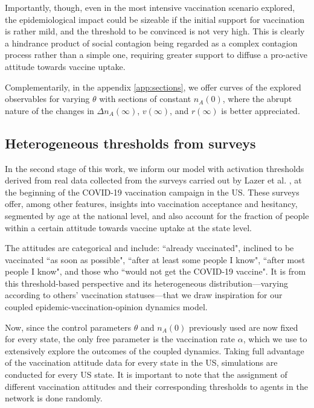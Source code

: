 \documentclass[
 reprint,
 amsmath,amssymb,
 aps,
]{revtex4-2}
\begin{document}
Importantly, though, even in the most intensive vaccination scenario explored, the epidemiological impact could be sizeable if the initial support for vaccination is rather mild, and the threshold to be convinced is not very high. This is clearly a hindrance product of social contagion being regarded as a complex contagion process rather than a simple one, requiring greater support to diffuse a pro-active attitude towards vaccine uptake.

Complementarily, in the appendix \ref{app:sections}, we offer curves of the explored observables for varying $\theta$ with sections of constant $n_A(0)$, where the abrupt nature of the changes in $\Delta n_A(\infty)$, $v(\infty)$, and $r(\infty)$ is better appreciated. %

\subsection{Heterogeneous thresholds from surveys}
\label{subsec:heterogeneous}

In the second stage of this work, we inform our model with activation thresholds derived from real data collected from the surveys carried out by Lazer et al. \cite{lazer2021covid}, at the beginning of the COVID-19 vaccination campaign in the US. These surveys offer, among other features, insights into vaccination acceptance and hesitancy, segmented by age at the national level, and also account for the fraction of people within a certain attitude towards vaccine uptake at the state level.

The attitudes are categorical and include: ``already vaccinated", inclined to be vaccinated ``as soon as possible", ``after at least some people I know", ``after most people I know", and those who ``would not get the COVID-19 vaccine". It is from this threshold-based perspective and its heterogeneous distribution—varying according to others' vaccination statuses—that we draw inspiration for our coupled epidemic-vaccination-opinion dynamics model.

Now, since the control parameters $\theta$ and $n_A(0)$ previously used are now fixed for every state, the only free parameter is the vaccination rate $\alpha$, which we use to extensively explore the outcomes of the coupled dynamics. Taking full advantage of the vaccination attitude data for every state in the US, simulations are conducted for every US state. It is important to note that the assignment of different vaccination attitudes and their corresponding thresholds to agents in the network is done randomly.
\end{document}
